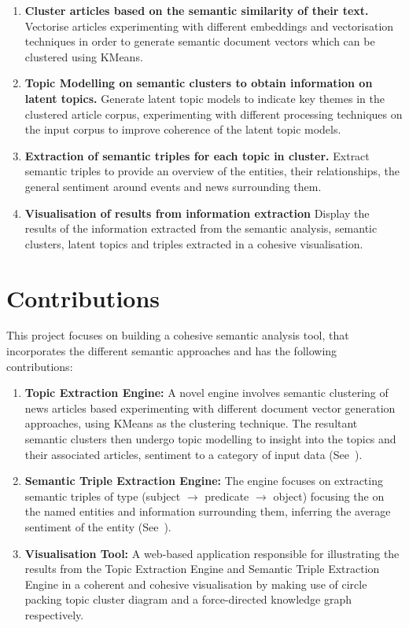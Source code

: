 \begin{enumerate}
    \item \textbf{Cluster articles based on the semantic similarity of their text.} Vectorise articles experimenting with different embeddings and vectorisation techniques in order to generate semantic document vectors which can be clustered using KMeans.  

    \item \textbf{Topic Modelling on semantic clusters to obtain information on latent topics.} Generate latent topic models to indicate key themes in the clustered article corpus, experimenting with different processing techniques on the input corpus to improve coherence of the latent topic models.

    \item \textbf{Extraction of semantic triples for each topic in cluster.} Extract semantic triples to provide an overview of the entities, their relationships, the general sentiment around events and news surrounding them.

    \item \textbf{Visualisation of results from information extraction} Display the results of the information extracted from the semantic analysis, semantic clusters, latent topics and triples extracted in a cohesive visualisation.  
    
\end{enumerate}

\section{Contributions} \label{contributions}

This project focuses on building a cohesive semantic analysis tool, that incorporates the different semantic approaches and has the following contributions: 
 
\begin{enumerate}
    \item \textbf{Topic Extraction Engine:} A novel engine involves semantic clustering of news articles based experimenting with different document vector generation approaches, using KMeans as the clustering technique. The resultant semantic clusters then undergo topic modelling to insight into the topics and their associated articles, sentiment to a category of input data (See~).

    \item \textbf{Semantic Triple Extraction Engine:} The engine focuses on extracting semantic triples of type (subject $\rightarrow$ predicate $\rightarrow$ object) focusing the on the named entities and information surrounding them, inferring the average sentiment of the entity (See~).
  
    \item \textbf{Visualisation Tool:} A web-based application responsible for illustrating the results from the Topic Extraction Engine and Semantic Triple Extraction Engine in a coherent and cohesive visualisation by making use of circle packing topic cluster diagram and a force-directed knowledge graph respectively. 


\end{enumerate}


